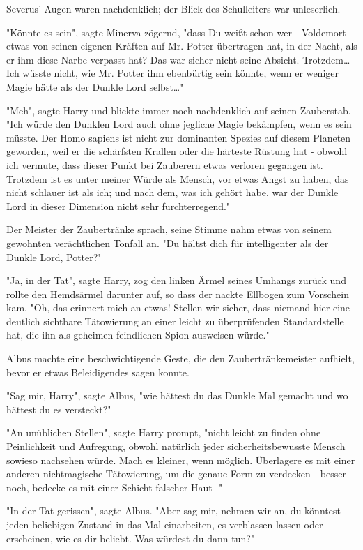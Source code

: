 {Severus' Augen waren nachdenklich; der Blick des Schulleiters war unleserlich.

"Könnte es sein", sagte Minerva zögernd, "dass Du-weißt-schon-wer - Voldemort - etwas von seinen eigenen Kräften auf Mr. Potter übertragen hat, in der Nacht, als er ihm diese Narbe verpasst hat? Das war sicher nicht seine Absicht. Trotzdem… Ich wüsste nicht, wie Mr. Potter ihm ebenbürtig sein könnte, wenn er weniger Magie hätte als der Dunkle Lord selbst…"

"Meh", sagte Harry und blickte immer noch nachdenklich auf seinen Zauberstab. "Ich würde den Dunklen Lord auch ohne jegliche Magie bekämpfen, wenn es sein müsste. Der Homo sapiens ist nicht zur dominanten Spezies auf diesem Planeten geworden, weil er die schärfsten Krallen oder die härteste Rüstung hat - obwohl ich vermute, dass dieser Punkt bei Zauberern etwas verloren gegangen ist. Trotzdem ist es unter meiner Würde als Mensch, vor etwas Angst zu haben, das nicht schlauer ist als ich; und nach dem, was ich gehört habe, war der Dunkle Lord in dieser Dimension nicht sehr furchterregend."

Der Meister der Zaubertränke sprach, seine Stimme nahm etwas von seinem gewohnten verächtlichen Tonfall an. "Du hältst dich für intelligenter als der Dunkle Lord, Potter?"

"Ja, in der Tat", sagte Harry, zog den linken Ärmel seines Umhangs zurück und rollte den Hemdsärmel darunter auf, so dass der nackte Ellbogen zum Vorschein kam. "Oh, das erinnert mich an etwas! Stellen wir sicher, dass niemand hier eine deutlich sichtbare Tätowierung an einer leicht zu überprüfenden Standardstelle hat, die ihn als geheimen feindlichen Spion ausweisen würde."

Albus machte eine beschwichtigende Geste, die den Zaubertränkemeister aufhielt, bevor er etwas Beleidigendes sagen konnte.

"Sag mir, Harry", sagte Albus, "wie hättest du das Dunkle Mal gemacht und wo hättest du es versteckt?"

"An unüblichen Stellen", sagte Harry prompt, "nicht leicht zu finden ohne Peinlichkeit und Aufregung, obwohl natürlich jeder sicherheitsbewusste Mensch sowieso nachsehen würde. Mach es kleiner, wenn möglich. Überlagere es mit einer anderen nichtmagische Tätowierung, um die genaue Form zu verdecken - besser noch, bedecke es mit einer Schicht falscher Haut -"

"In der Tat gerissen", sagte Albus. "Aber sag mir, nehmen wir an, du könntest jeden beliebigen Zustand in das Mal einarbeiten, es verblassen lassen oder erscheinen, wie es dir beliebt. Was würdest du dann tun?"

}
